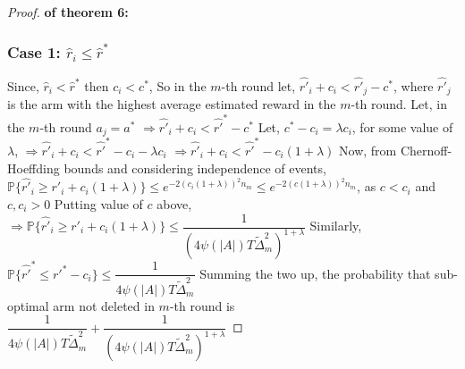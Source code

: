 \begin{proof}\textbf{ of theorem 6:}
\subsubsection*{\textbf{Case 1: $\hat{r}_{i} \leq \hat{r}^{*}$}}

Since, $\hat{r}_{i}< \hat{r}^{*}$ then $c_{i}<c^{*}$,
\newline
So in the $m$-th round let,
\newline 
\hspace*{8em}$\hat{r'}_{i}+c_{i}<\hat{r'}_{j}-c^{*}$, where $\hat{r'}_{j}$ is the arm with the highest average estimated reward in the $m$-th round. 
\newline
Let, in the $m$-th round $a_{j}=a^{*}$
\newline
\hspace*{8em}$\Rightarrow \hat{r'}_{i}+c_{i}<\hat{r'}^{*}-c^{*} $
\newline
Let, $c^{*}-c_{i}=\lambda c_{i}$, for some value of $\lambda $,
\newline
\hspace*{8em}$\Rightarrow \hat{r'}_{i} + c_{i}  < \hat{r'}^{*} - c_{i} - \lambda c_{i} $
\newline
\hspace*{8em}$\Rightarrow \hat{r'}_{i} + c_{i} < \hat{r'}^{*}-c_{i}( 1 + \lambda)  $
\newline
Now, from Chernoff-Hoeffding bounds and considering independence of events,
\newline 
\hspace*{8em}$\mathbb{P}\lbrace\hat{r'}_{i} \geq r'_{i} + c_{i}( 1 + \lambda)\rbrace \leq e^{-2(c_{i}(1+\lambda))^{2}n_{m}} \leq e^{-2(c(1+\lambda))^{2}n_{m}}$, as $c<c_{i}$ and $c,c_{i} > 0 $
\newline Putting value of $c$ above,
\newline\hspace*{8em} $\Rightarrow \mathbb{P} \lbrace  \hat{r'}_{i} \geq r'_{i} + c_{i}( 1 + \lambda) \rbrace \leq \dfrac{1}{(4\psi(|A|)T\tilde{\Delta}_{m}^{2})^{1+\lambda}}$
\newline Similarly, $\mathbb{P} \lbrace \hat{r'}^{*} \leq r'^{*} - c_{i} \rbrace\leq \dfrac{1}{4\psi(|A|)T\tilde{\Delta}_{m}^{2}}$
\newline
Summing the two up, the probability that sub-optimal arm not deleted in $m$-th round is $\dfrac{1}{4\psi(|A|)T\tilde{\Delta}_{m}^{2}} + \dfrac{1}{(4\psi(|A|)T\tilde{\Delta}_{m}^{2})^{1+\lambda}}$


\end{proof}
